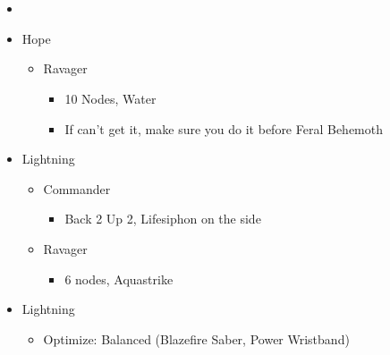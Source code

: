 \chapter{}

\begin{menu}
\begin{multicols}{2}
\begin{itemize}
    \paradigm
    \begin{itemize}
        \item {}%
{\paradigmline[1]{\textit{\rav}}{\textit{\com}}{}}%
{\paradigmline{(\med)}{(\com)}{}}%
{\paradigmline{\syn}{(\com)}{}}%
{\paradigmline{\rav}{\rav}{}}%
{\paradigmline{\rav}{[\rav]}{}}%
{\paradigmline{[\rav]}{\com}{}}
    \end{itemize}
    \crystarium
    \begin{itemize}
        \item Hope
        \begin{itemize}
            \item Ravager
            \begin{itemize}
                \item 10 Nodes, Water
                \item If can't get it, make sure you do it before Feral Behemoth
            \end{itemize}
        \end{itemize}
        \item Lightning
        \begin{itemize}
            \item Commander
            \begin{itemize}
                \item Back 2 Up 2, Lifesiphon on the side
            \end{itemize}
            \item Ravager
            \begin{itemize}
                \item 6 nodes, Aquastrike
            \end{itemize}
        \end{itemize}
    \end{itemize}
    \columnbreak
    \equip
    \begin{itemize}
        \item Lightning
        \begin{itemize}
            \item Optimize: Balanced (Blazefire Saber, Power Wristband)
        \end{itemize}
    \end{itemize}
\end{itemize}
\end{multicols}
\end{menu}

